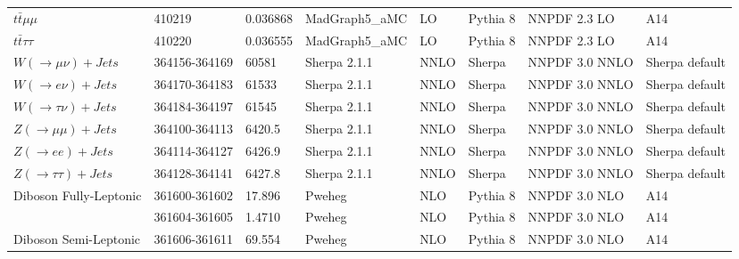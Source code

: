 \begin{tabular}{L{35mm} C{28mm}C{28mm}C{28mm}C{14mm}C{23mm}C{25mm}C{24mm}}
$t\bar{t}\mu\mu$            & 410219        & 0.036868                          & MadGraph5\_aMC  & LO       & Pythia 8      & NNPDF 2.3 LO   & A14            \\
$t\bar{t}\tau\tau$          & 410220        & 0.036555                          & MadGraph5\_aMC  & LO       & Pythia 8      & NNPDF 2.3 LO   & A14            \\
$W(\to \mu\nu) + Jets$      & 364156-364169 & 60581                             & Sherpa 2.1.1    & NNLO     & Sherpa        & NNPDF 3.0 NNLO & Sherpa default \\
$W(\to e\nu) + Jets$        & 364170-364183 & 61533                             & Sherpa 2.1.1    & NNLO     & Sherpa        & NNPDF 3.0 NNLO & Sherpa default \\
$W(\to \tau\nu) + Jets$     & 364184-364197 & 61545                             & Sherpa 2.1.1    & NNLO     & Sherpa        & NNPDF 3.0 NNLO & Sherpa default \\
$Z(\to \mu\mu) + Jets$      & 364100-364113 & 6420.5                            & Sherpa 2.1.1    & NNLO     & Sherpa        & NNPDF 3.0 NNLO & Sherpa default \\
$Z(\to ee) + Jets$          & 364114-364127 & 6426.9                            & Sherpa 2.1.1    & NNLO     & Sherpa        & NNPDF 3.0 NNLO & Sherpa default \\
$Z(\to \tau\tau) + Jets$    & 364128-364141 & 6427.8                            & Sherpa 2.1.1    & NNLO     & Sherpa        & NNPDF 3.0 NNLO & Sherpa default \\
Diboson Fully-Leptonic      & 361600-361602 & 17.896                            & Pweheg          & NLO      & Pythia 8      & NNPDF 3.0 NLO  & A14            \\
                            & 361604-361605 & 1.4710                            & Pweheg          & NLO      & Pythia 8      & NNPDF 3.0 NLO  & A14            \\
Diboson Semi-Leptonic       & 361606-361611 & 69.554                            & Pweheg          & NLO      & Pythia 8      & NNPDF 3.0 NLO  & A14            \\
\bottomrule
\end{tabular}